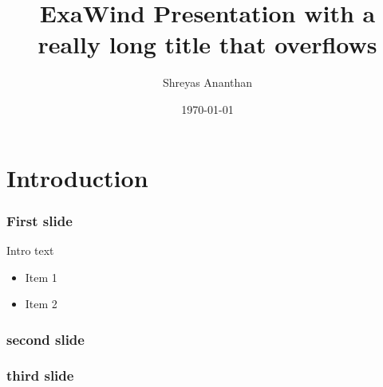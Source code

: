 \documentclass[aspectratio=1610,10pt]{beamer}
\title{ExaWind Presentation with a really long title that overflows }
\author{Shreyas Ananthan}
\institute[NREL]{National Renewable Energy Laboratory \\ Golden, CO}
\date{\today}
\begin{document}
\maketitle

\section{Introduction}

\begin{frame}
  \frametitle{First slide}
  Intro text
  \begin{itemize}
  \item Item 1
  \item Item 2
  \end{itemize}
\end{frame}

\begin{frame}
  \frametitle{second slide}
\end{frame}

\begin{frame}
  \frametitle{third slide}
\end{frame}
\end{document}
